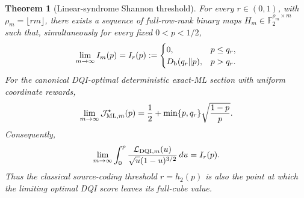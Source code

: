\documentclass[journal]{IEEEtran}
\newtheorem{theorem}{Theorem}
\theoremstyle{definition}
\theoremstyle{remark}
\newcommand{\F}{\mathbb F}
\begin{document}
\begin{theorem}[Linear-syndrome Shannon threshold]
\label{thm:linear-shannon-dqi}
For every $r\in(0,1)$, with $\rho_m=\lfloor rm\rfloor$, there exists a
sequence of full-row-rank binary maps
$H_m\in\F_2^{\rho_m\times m}$ such that, simultaneously for
every fixed $0<p<1/2$,
\begin{equation}
 \lim_{m\to\infty} I_m(p)=I_r(p):=
 \begin{cases}
  0, & p\le q_r,\\
  D_{\rm b}(q_r\Vert p), & p>q_r.
 \end{cases}
 \label{eq:linear-source-exponent}
\end{equation}
For the canonical DQI-optimal deterministic exact-ML section with uniform
coordinate rewards,
\begin{equation}
 \lim_{m\to\infty}\mathcal J_{{\rm ML},m}^{\star}(p)
 =\frac12+\min\{p,q_r\}\sqrt{\frac{1-p}{p}}.
 \label{eq:linear-source-dqi-score}
\end{equation}
Consequently,
\begin{equation}
 \lim_{m\to\infty}
 \int_0^p\frac{\mathcal L_{{\rm DQI},m}(u)}
 {\sqrt u(1-u)^{3/2}}\,du=I_r(p).
 \label{eq:linear-source-dqi-area}
\end{equation}
Thus the classical source-coding threshold $r=h_2(p)$ is also the point at
which the limiting optimal DQI score leaves its full-cube value.
\end{theorem}
\end{document}
